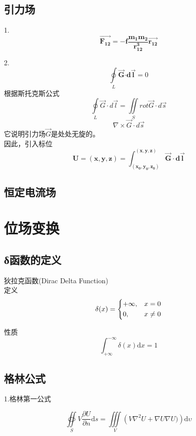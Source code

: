 \documentclass[UTF8]{ctexart}       %
\begin{document}
    \subsection{引力场}

1.{} \\
$$ \overrightarrow{\mathbf{F_{12}}} = \mathbf{-f\frac{m_1m_2}{r_{12} ^3}}\overrightarrow{\mathbf{r_{12}}}$$

2.{}
$$ \oint\limits_L\overrightarrow{\mathbf{G}}\mathbf{\cdot d\overrightarrow {l}} = 0$$
根据斯托克斯公式
$$\oint\limits_L \overrightarrow{G}\cdot d\overrightarrow{l} = \iint\limits_S rot\overrightarrow{G}\cdot d\overrightarrow{s}$$
$$\nabla \times \overrightarrow{G}\cdot d\overrightarrow{s}$$
它说明引力场$\overrightarrow{G}$是处处无旋的。\\
因此，引入标位
$$ \mathbf{U=(x,y,z)=\int _{(x_0,y_0,z_0)}^{(x,y,z)}\overrightarrow{G}\cdot d\overrightarrow{l}} $$


    \subsection{恒定电流场}
\section{位场变换}
    \subsection{δ函数的定义}

狄拉克函数(Dirac Delta Function) \\

{\heiti 定义}     %
$$\delta(x) =
\begin{dcases}
+\infty,&x = 0 \\
 0,&x \neq 0
\end{dcases}$$

{\heiti 性质}  \\
$$\int_{+\infty}^{-\infty} \delta(x)\mathrm{d}x = 1$$


    \subsection{格林公式}

1.格林第一公式\cite{GreenEquation}    %

$$\oiint\limits_S V\frac{\partial U}{\partial n}\mathrm{d}s     %
= \iiint\limits_V \left(V\nabla^ 2 U+\nabla U \nabla U)
\right)\mathrm{d}\upsilon$$
\end{document}
